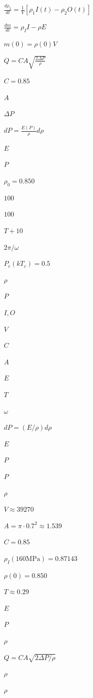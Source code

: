 
$\frac{d\rho_2}{dt}=\frac{1}{V}[\rho_1 I(t)-\rho_2 O(t)]$

$\frac{dm}{dt}=\rho_I I-\rho E$

$m(0)=\rho(0)V$

$Q=CA\sqrt{\frac{2\Delta P}{\rho}}$

$C=0.85$

$A$

$\Delta P$

$dP=\frac{E(P)}{\rho}d\rho$

$E$

$P$

$\rho_0=0.850$

$100$

$100$

$T+10$

$2\pi/\omega$

$P_c(kT_c)=0.5$

$\rho$

$P$

$I,O$

$V$

$C$

$A$

$E$

$T$

$\omega$

$dP=(E/\rho)d\rho$

$E$

$P$

$P$

$ρ$

$V\approx39270$

$A=\pi\cdot0.7^2\approx1.539$

$C=0.85$

$\rho_I(160\mathrm{MPa})=0.87143$

$\rho(0)=0.850$

$T\approx0.29$

$E$

$P$

$\rho$

$Q=CA\sqrt{2\Delta P/\rho}$

$\rho$

$\rho$
